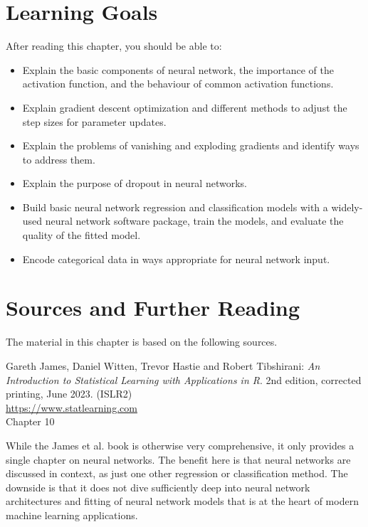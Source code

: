 %
%
\section*{Learning Goals}

After reading this chapter, you should be able to:
\begin{itemize}
   \item Explain the basic components of neural network, the importance of the activation function, and the behaviour of common activation functions.
   \item Explain gradient descent optimization and different methods to adjust the step sizes for parameter updates.
   \item Explain the problems of vanishing and exploding gradients and identify ways to address them.
   \item Explain the purpose of dropout in neural networks.
   \item Build basic neural network regression and classification models with a widely-used neural network software package, train the models, and evaluate the quality of the fitted model.
   \item Encode categorical data in ways appropriate for neural network input.
\end{itemize}


\section*{Sources and Further Reading}

The material in this chapter is based on the following sources. 

\begin{resourcebox}
Gareth James, Daniel Witten, Trevor Hastie and Robert Tibshirani: \emph{An Introduction to Statistical Learning with Applications in R}. 2nd edition, corrected printing, June 2023. (ISLR2) \\

\small\url{https://www.statlearning.com}\normalsize \\

Chapter 10
\end{resourcebox}

While the James et al. book is otherwise very comprehensive, it only provides a single chapter on neural networks. The benefit here is that neural networks are discussed in context, as just one other regression or classification method. The downside is that it does not dive sufficiently deep into neural network architectures and fitting of neural network models that is at the heart of modern machine learning applications.

